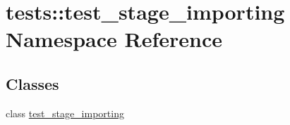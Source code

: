 \hypertarget{namespacetests_1_1test__stage__importing}{\section{tests\-:\-:test\-\_\-stage\-\_\-importing \-Namespace \-Reference}
\label{namespacetests_1_1test__stage__importing}
}
\subsection*{\-Classes}
\begin{DoxyCompactItemize}
\item 
class \hyperlink{classtests_1_1test__stage__importing_1_1test__stage__importing}{test\-\_\-stage\-\_\-importing}
\end{DoxyCompactItemize}
